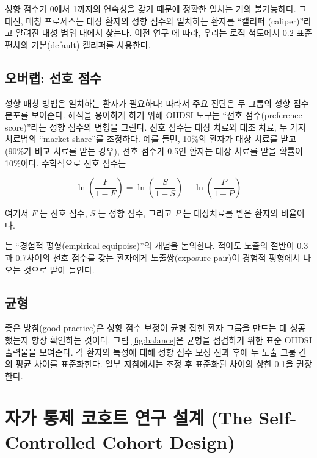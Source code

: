 \documentclass[11pt]{book}
\theoremstyle{definition}
\theoremstyle{definition}
\theoremstyle{definition}
\theoremstyle{remark}
\begin{document}

성향 점수가 0에서 1까지의 연속성을 갖기 때문에 정확한 일치는 거의
불가능하다. 그 대신, 매칭 프로세스는 대상 환자의 성향 점수와 일치하는
환자를 ``캘리퍼 (caliper)''라고 알려진 내성 범위 내에서 찾는다. 이전
연구 \citep{austin_2011}에 따라, 우리는 로직 척도에서 0.2 표준편차의
기본(default) 캘리퍼를 사용한다.

\subsection{오버랩: 선호 점수}\label{--}


성향 매칭 방법은 일치하는 환자가 필요하다! 따라서 주요 진단은 두 그룹의
성향 점수 분포를 보여준다. 해석을 용이하게 하기 위해 OHDSI 도구는 ``선호
점수(preference score)''라는 성향 점수의 변형을 그린다.
\citep{walker_2013} 선호 점수는 대상 치료와 대조 치료, 두 가지 치료법의
``market share''를 조정하다. 예를 들면, 10\%의 환자가 대상 치료를 받고
(90\%가 비교 치료를 받는 경우), 선호 점수가 0.5인 환자는 대상 치료를
받을 확률이 10\%이다. 수학적으로 선호 점수는

\[\ln\left(\frac{F}{1-F}\right)=\ln\left(\frac{S}{1-S}\right)-\ln\left(\frac{P}{1-P}\right)\]

여기서 \(F\) 는 선호 점수, \(S\) 는 성향 점수, 그리고 \(P\) 는
대상치료를 받은 환자의 비율이다.

\citet{walker_2013} 는 ``경험적 평형(empirical equipoise)''의 개념을
논의한다. 적어도 노출의 절반이 0.3과 0.7사이의 선호 점수를 갖는 환자에게
노출쌍(exposure pair)이 경험적 평형에서 나오는 것으로 받아 들인다.

\subsection{균형}

 

좋은 방침(good practice)은 성향 점수 보정이 균형 잡힌 환자 그룹을 만드는
데 성공했는지 항상 확인하는 것이다. 그림 \ref{fig:balance}은 균형을
점검하기 위한 표준 OHDSI 출력물을 보여준다. 각 환자의 특성에 대해 성향
점수 보정 전과 후에 두 노출 그룹 간의 평균 차이를 표준화한다. 일부
지침에서는 조정 후 표준화된 차이의 상한 0.1을 권장한다.
\citep{rubin_2001}

\section{자가 통제 코호트 연구 설계 (The Self-Controlled Cohort
Design)}\label{-----the-self-controlled-cohort-design}
\end{document}
